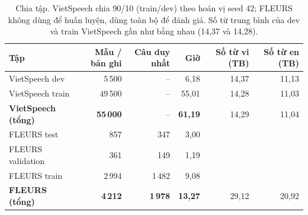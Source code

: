 \documentclass[12pt,a4paper]{article}
\begin{document}
\begin{table}[H]\centering\small
\begin{tabular}{lrrrrr}\toprule
Tập & Mẫu / bản ghi & Câu duy nhất & Giờ & Số từ vi (TB) & Số từ en (TB)\\\midrule
VietSpeech dev & 5\,500 & -- & 6,18 & 14,37 & 11,13\\
VietSpeech train & 49\,500 & -- & 55,01 & 14,28 & 11,03\\
\textbf{VietSpeech (tổng)} & \textbf{55\,000} & -- & \textbf{61,19} & 14,29 & 11,04\\\midrule
FLEURS test & 857 & 347 & 3,00 & \multicolumn{2}{c}{}\\
FLEURS validation & 361 & 149 & 1,19 & \multicolumn{2}{c}{}\\
FLEURS train & 2\,994 & 1\,482 & 9,08 & \multicolumn{2}{c}{}\\
\textbf{FLEURS (tổng)} & \textbf{4\,212} & \textbf{1\,978} & \textbf{13,27} & 29,12 & 20,92\\
\bottomrule\end{tabular}
\caption{Chia tập. VietSpeech chia 90/10 (train/dev) theo hoán vị seed 42; FLEURS không dùng để huấn luyện, dùng toàn bộ để đánh giá. Số từ trung bình của dev và train VietSpeech gần như bằng nhau (14,37 và 14,28).}\label{tab:splits}
\end{table}
\end{document}
